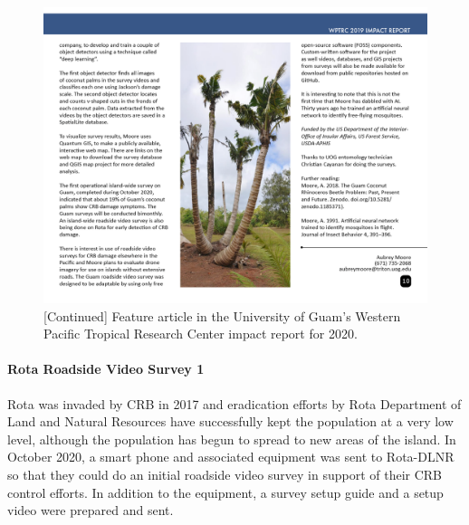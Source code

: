\documentclass[12pt,letterpaper,english,bibliography=totocnumbered, abstract=on]{scrartcl}
\begin{document}
\begin{figure}[h]
	\centering
	\includegraphics[width=1\linewidth]{images/impact-report10.png}
	\caption{[Continued] Feature article in the University of Guam's Western Pacific Tropical Research Center impact report for 2020.}
	\label{fig:roadside1-4}
\end{figure}

%
%


\clearpage
\paragraph{Rota Roadside Video Survey 1}

Rota was invaded by CRB in 2017 and eradication efforts by Rota Department of Land and Natural Resources have successfully kept the population at a very low level, although the population has begun to spread to new areas of the island. In October 2020, a smart phone and associated equipment was sent to Rota-DLNR so that they could do an initial roadside video survey in support of their CRB control efforts. In addition to the equipment, a survey setup guide \cite{mooreSetAutomatedRoadside2020} and a setup video \cite{mooreYouTubeVideoMounting2020} were prepared and sent.
 
\end{document}
